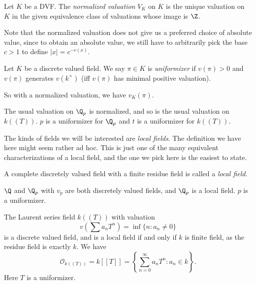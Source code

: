 \documentclass[a4paper]{article}
\begin{document}
\begin{defi}
  Let $K$ be a DVF. The \emph{normalized valuation} $V_K$ on $K$ is the unique valuation on $K$ in the given equivalence class of valuations whose image is $\Z$.
\end{defi}

Note that the normalized valuation does not give us a preferred choice of absolute value, since to obtain an absolute value, we still have to arbitrarily pick the base $c > 1$ to define $|x| = c^{-v(x)}$.

\begin{defi}[Uniformizer]
  Let $K$ be a discrete valued field. We say $\pi \in K$ is \emph{uniformizer} if $v(\pi) > 0$ and $v(\pi)$ generates $v(k^\times)$ (iff $v(\pi)$ has minimal positive valuation).
\end{defi}
So with a normalized valuation, we have $v_K(\pi)$.

\begin{eg}
  The usual valuation on $\Q_p$ is normalized, and so is the usual valuation on $k((T))$. $p$ is a uniformizer for $\Q_p$ and $t$ is a uniformizer for $k((T))$.
\end{eg}

The kinds of fields we will be interested are \emph{local fields}. The definition we have here might seem rather ad hoc. This is just one of the many equivalent characterizations of a local field, and the one we pick here is the easiest to state.
\begin{defi}
  A complete discretely valued field with a finite residue field is called a \emph{local field}.
\end{defi}

\begin{eg}
  $\Q$ and $\Q_p$ with $v_p$ are both discretely valued fields, and $\Q_p$ is a local field. $p$ is a uniformizer.
\end{eg}

\begin{eg}
  The Laurent series field $k((T))$ with valuation
  \[
    v\left(\sum a_n T^n\right) = \inf\{n: a_n \not= 0\}
  \]
  is a discrete valued field, and is a local field if and only if $k$ is finite field, as the residue field is exactly $k$. We have
  \[
    \mathcal{O}_{k((T))} = k[[T]] = \left\{\sum_{n = 0}^\infty a_n T^n: a_n \in k\right\}.
  \]
  Here $T$ is a uniformizer.
\end{eg}
\end{document}
